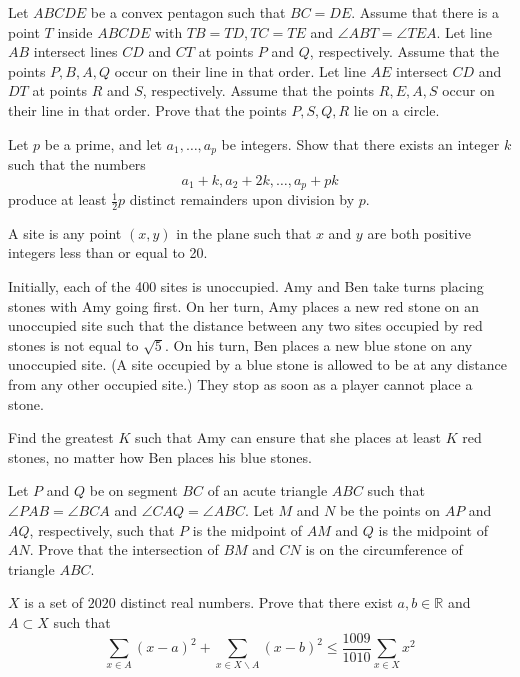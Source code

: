 \documentclass[11pt]{scrartcl}
\begin{document}
\begin{problem}[8417327567048605288]
Let $ABCDE$ be a convex pentagon such that $BC=DE$. Assume that there is a point $T$ inside $ABCDE$ with $TB=TD,TC=TE$ and $\angle ABT = \angle TEA$. Let line $AB$ intersect lines $CD$ and $CT$ at points $P$ and $Q$, respectively. Assume that the points $P,B,A,Q$ occur on their line in that order. Let line $AE$ intersect $CD$ and $DT$ at points $R$ and $S$, respectively. Assume that the points $R,E,A,S$ occur on their line in that order. Prove that the points $P,S,Q,R$ lie on a circle.
\end{problem}
\begin{problem}[4278278843148290847]
	Let $p$ be a prime, and let $a_1, \dots, a_p$ be integers. Show that there exists an integer $k$ such that the numbers
\[a_1 + k, a_2 + 2k, \dots, a_p + pk\]produce at least $\tfrac{1}{2} p$ distinct remainders upon division by $p$.
\end{problem}
\begin{problem}[6246999615324043054]
	A site is any point $(x, y)$ in the plane such that $x$ and $y$ are both positive integers less than or equal to 20.

Initially, each of the 400 sites is unoccupied. Amy and Ben take turns placing stones with Amy going first. On her turn, Amy places a new red stone on an unoccupied site such that the distance between any two sites occupied by red stones is not equal to $\sqrt{5}$. On his turn, Ben places a new blue stone on any unoccupied site. (A site occupied by a blue stone is allowed to be at any distance from any other occupied site.) They stop as soon as a player cannot place a stone.

Find the greatest $K$ such that Amy can ensure that she places at least $K$ red stones, no matter how Ben places his blue stones.
\end{problem}
\begin{problem}[5026826170538858627]
Let $P$ and $Q$ be on segment $BC$ of an acute triangle $ABC$ such that $\angle PAB=\angle BCA$ and $\angle CAQ=\angle ABC$. Let $M$ and $N$ be the points on $AP$ and $AQ$, respectively, such that $P$ is the midpoint of $AM$ and $Q$ is the midpoint of $AN$. Prove that the intersection of $BM$ and $CN$ is on the circumference of triangle $ABC$.
\end{problem}
\begin{problem}[176031103945886]
	$X$ is a set of $2020$ distinct real numbers. Prove that there exist $a,b\in \mathbb{R}$ and $A\subset X$ such that
$$\sum_{x\in A}(x-a)^2 +\sum_{x\in X\backslash A}(x-b)^2\le \frac{1009}{1010}\sum_{x\in X}x^2$$
\end{problem}
\end{document}
